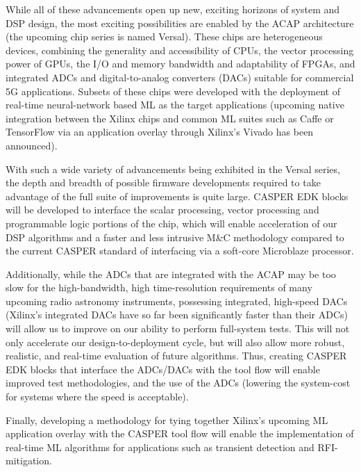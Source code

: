\documentclass[10pt]{myNSF}
\begin{document}
While all of these advancements open up new, exciting horizons of
system and DSP design, the most exciting possibilities are enabled by
the ACAP architecture (the upcoming chip series is named
Versal). These chips are heterogeneous devices, combining the
generality and accessibility of CPUs, the vector processing power of
GPUs, the I/O and memory bandwidth and adaptability of FPGAs, and
integrated ADCs and digital-to-analog converters (DACs) suitable for
commercial 5G applications. Subsets of these chips were developed with
the deployment of real-time neural-network based ML as the target
applications (upcoming native integration between the Xilinx chips and
common ML suites such as Caffe or TensorFlow via an application
overlay through Xilinx’s Vivado has been announced).

With such a wide variety of advancements being exhibited in the Versal
series, the depth and breadth of possible firmware developments
required to take advantage of the full suite of improvements is quite
large. CASPER EDK blocks will be developed to interface the scalar
processing, vector processing and programmable logic portions of the
chip, which will enable acceleration of our DSP algorithms and a
faster and less intrusive M\&C methodology compared to the current
CASPER standard of interfacing via a soft-core Microblaze processor.

Additionally, while the ADCs that are integrated with the ACAP may be
too slow for the high-bandwidth, high time-resolution requirements of
many upcoming radio astronomy instruments, possessing integrated,
high-speed DACs (Xilinx’s integrated DACs have so far been
significantly faster than their ADCs) will allow us to improve on our
ability to perform full-system tests.  This will not only accelerate
our design-to-deployment cycle, but will also allow more robust,
realistic, and real-time evaluation of future algorithms.  Thus,
creating CASPER EDK blocks that interface the ADCs/DACs with the tool
flow will enable improved test methodologies, and the use of the ADCs
(lowering the system-cost for systems where the speed is acceptable).

Finally, developing a methodology for tying together Xilinx’s upcoming
ML application overlay with the CASPER tool flow will enable the
implementation of real-time ML algorithms for applications such as
transient detection and RFI-mitigation.

\end{document}
